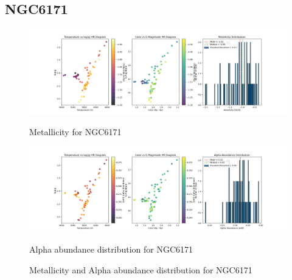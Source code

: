 \documentclass[a4paper,12pt]{article}
\begin{document}
\subsection{NGC6171}
\begin{figure}[H]
    \centering
    \begin{minipage}[b]{0.8\textwidth}
        \centering
        \includegraphics[width=\textwidth]{NGC6171_metalicity.png}
        \caption{Metallicity for NGC6171}
        \label{fig:NGC6171_metalicity}
    \end{minipage}
    \hfill
    \begin{minipage}[b]{0.8\textwidth}
        \centering
        \includegraphics[width=\textwidth]{NGC6171_alpha.png}
        \caption{Alpha abundance distribution for NGC6171}
        \label{fig:NGC6171_alpha}
    \end{minipage}
    \caption{Metallicity and Alpha abundance distribution for NGC6171}
    \label{fig:NGC6171_combined}
\end{figure}
\clearpage
\end{document}
